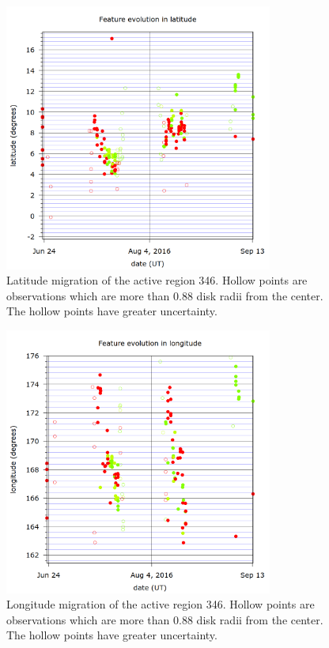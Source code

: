 \documentclass{aa}
\begin{document}
\begin{figure} \centering \includegraphics[width=8.8cm]{view_latitude_complex346.png}
\caption{Latitude migration of the active region 346. Hollow points are observations which are more than $0.88$ disk radii from the center. The hollow points have greater uncertainty.}
\label{complexlatitude} \end{figure}

\begin{figure} \centering \includegraphics[width=8.8cm]{view_longitude_complex346.png}
\caption{Longitude migration of the active region 346. Hollow points are observations which are more than $0.88$ disk radii from the center. The hollow points have greater uncertainty.}
\label{complexlatitude} \end{figure}
\end{document}
